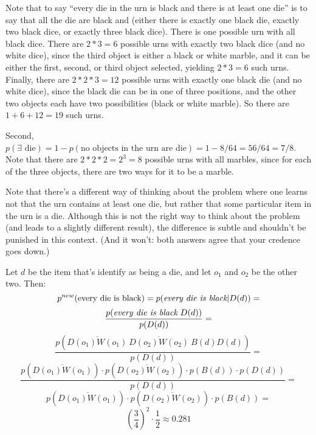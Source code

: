 \documentclass[12pt,letterpaper]{article}
\begin{document}
\begin{enumerate}
\begin{enumerate}
{Note that to say ``every die in the urn is black and there is at least one die'' is to say that all the die are black and (either there is exactly one black die, exactly two black dice, or exactly three black dice). There is one possible urn with all black dice. There are $2*3=6$ possible urns with exactly two black dice (and no white dice), since the third object is either a black or white marble, and it can be either the first, second, or third object selected, yielding  $2*3=6$ such urns. \\ Finally, there are $2*2*3=12$ possible urns with exactly one black die (and no white dice), since the black die can be in one of three positions, and the other two objects each have two possibilities (black or white marble). So there are $1+6+12 = 19$ such urns. 

Second, $p(\exists \text{  die}) = 1 - p(\text{no objects in the urn are die}) = 1 - 8/64 = 56/64=7/8$. Note that there are $2*2*2 = 2^3 = 8$ possible urns with all marbles, since for each of the three objects, there are two ways for it to be a marble. 


Note that there's a different way of thinking about the problem where one learns not that the urn contains at least one die, but rather that some particular item in the urn is a die. Although this is not the right way to think about the problem (and leads to a slightly different result), the difference is subtle and shouldn't be punished in this context. (And it won't: both answers agree that your credence goes down.)

Let $d$ be the item that's identify as being a die, and let $o_1$ and $o_2$ be the other two. Then:
 $$p^{new}(\text{every die is black}) = p(\emph{every die is black} | D(d)) =$$
 $$\frac{p(\emph{every die is black}  \ D(d))}{p(D(d))} =$$
 $$\frac{p(\overline{D(o_1)W(o_1)} \ \overline{D(o_2)W(o_2)} \ B(d) D(d))}{p(D(d))} =$$
  $$\frac{p(\overline{D(o_1)W(o_1)}) \cdot p (\overline{D(o_2)W(o_2)}) \cdot  p(B(d)) \cdot p(D(d))}{p(D(d))} =$$
    $$p(\overline{D(o_1)W(o_1)}) \cdot p (\overline{D(o_2)W(o_2)}) \cdot p(B(d))=$$
    $$\left(\frac{3}{4}\right)^2 \cdot \frac{1}{2} \approx 0.281$$
  
}
\end{enumerate}
\end{enumerate}
\end{document}
